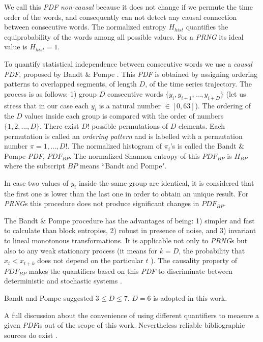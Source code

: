 We call this \emph{PDF}  \emph{non-causal} because it does not
change if we permute the time order of the words, and consequently
can not detect any causal connection between consecutive words. The normalized entropy
$H_{hist}$ quantifies the equiprobability of the words among all
possible values. For a \emph{PRNG} its ideal value is
$H_{hist}=1$.

To quantify statistical independence between consecutive words we
use a \emph{causal} \emph{PDF}, proposed by Bandt \& Pompe
\cite{Pompe2002}. This \emph{PDF} is obtained by assigning
ordering patterns to overlapped segments, of length $D$, of the
time series trajectory. The process is as follows: 1) group $D$
consecutive words $\{y_i,y_{i+1},...,y_{i+D}\}$ (let us stress that in our case each
$y_i$ is a natural number $\in[0,63]$). The ordering of the $D$
values inside each group is compared with the order of numbers
$\{1,2,...,D\}$. There exist $D!$ possible permutations of $D$ elements.
Each permutation is called an \emph{ordering pattern}
\cite{Amigo2006} and is labelled with a permutation number
$\pi=1,...,D!$. The normalized histogram of $\pi_i$'s is called
the Bandt \& Pompe \emph{PDF}, $PDF_{BP}$. The normalized Shannon entropy of
this $PDF_{BP}$ is $H_{BP}$ where the subscript $BP$ means ``Bandt
and Pompe".

In case two values of $y_i$ inside the same group are identical,
it is considered that the first one is lower than the last one in
order to obtain an unique result. For \emph{PRNG}s this procedure
does not produce significant changes in  $PDF_{BP}$.

The  Bandt \& Pompe procedure has the advantages of being: 1) simpler and
fast to calculate than block entropies, 2)
robust in presence of noise, and 3) invariant to lineal
monotonous transformations. It is applicable not only to
\emph{PRNG}s but also to any weak stationary process (it means for $k=D$,
the probability that $x_t < x_{t+k}$ does not depend on the
particular $t$ \cite{Pompe2002}). The causality property of $PDF_{BP}$
makes the quantifiers based on this \emph{PDF} to discriminate
between deterministic and stochastic systems \cite{Rosso2007B}.

Bandt and Pompe suggested $3\leq D \leq7$. $D=6$ is adopted
in this work.

A full discussion about the convenience of using different quantifiers
to measure a given \emph{PDF}is out of the scope of this work.
Nevertheless reliable bibliographic sources
do exist \cite{Wackerbauer1994,Lopez1995,Rosso2007A,DeMicco2008,Rosso2009,Martin2006,Rosso2012}.

